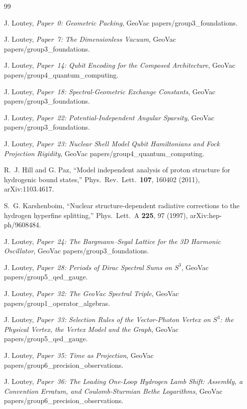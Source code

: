 \documentclass[11pt,a4paper]{article}
\theoremstyle{plain}
\theoremstyle{definition}
\newcommand{\sphere}[1]{S^{#1}}
\begin{document}
\begin{thebibliography}{99}

J. Loutey, \emph{Paper~0:  Geometric Packing}, GeoVac papers/group3\_foundations.

J. Loutey, \emph{Paper~7:  The Dimensionless Vacuum}, GeoVac papers/group3\_foundations.

J. Loutey, \emph{Paper~14:  Qubit Encoding for the Composed Architecture}, GeoVac papers/group4\_quantum\_computing.

J. Loutey, \emph{Paper~18:  Spectral-Geometric Exchange Constants}, GeoVac papers/group3\_foundations.

J. Loutey, \emph{Paper~22:  Potential-Independent Angular Sparsity}, GeoVac papers/group3\_foundations.

J. Loutey, \emph{Paper~23:  Nuclear Shell Model Qubit Hamiltonians and Fock Projection Rigidity}, GeoVac papers/group4\_quantum\_computing.

R.~J. Hill and G. Paz, ``Model independent analysis of proton structure for hydrogenic bound states,'' Phys.~Rev.~Lett.~\textbf{107}, 160402 (2011), arXiv:1103.4617.

S.~G. Karshenboim, ``Nuclear structure-dependent radiative corrections to the hydrogen hyperfine splitting,'' Phys.~Lett.~A \textbf{225}, 97 (1997), arXiv:hep-ph/9608484.

J. Loutey, \emph{Paper~24:  The Bargmann--Segal Lattice for the 3D Harmonic Oscillator}, GeoVac papers/group3\_foundations.

J. Loutey, \emph{Paper~28:  Periods of Dirac Spectral Sums on $\sphere{3}$}, GeoVac papers/group5\_qed\_gauge.

J. Loutey, \emph{Paper~32:  The GeoVac Spectral Triple}, GeoVac papers/group1\_operator\_algebras.

J. Loutey, \emph{Paper~33:  Selection Rules of the Vector-Photon Vertex on $\sphere{3}$: the Physical Vertex, the Vertex Model and the Graph}, GeoVac papers/group5\_qed\_gauge.

J. Loutey, \emph{Paper~35:  Time as Projection}, GeoVac papers/group6\_precision\_observations.

J. Loutey, \emph{Paper~36:  The Leading One-Loop Hydrogen Lamb Shift: Assembly, a Convention Erratum, and Coulomb-Sturmian Bethe Logarithms}, GeoVac papers/group6\_precision\_observations.


\end{thebibliography}
\end{document}
